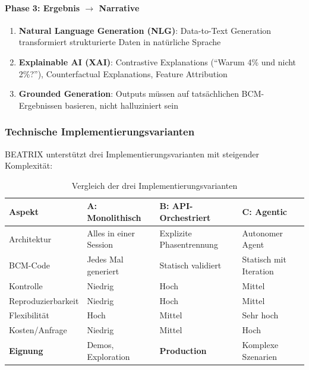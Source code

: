 \paragraph{Phase 3: Ergebnis $\rightarrow$ Narrative}

\begin{enumerate}
    \item \textbf{Natural Language Generation (NLG)}: Data-to-Text Generation transformiert strukturierte Daten in natürliche Sprache

    \item \textbf{Explainable AI (XAI)}: Contrastive Explanations (``Warum 4\% und nicht 2\%?''), Counterfactual Explanations, Feature Attribution

    \item \textbf{Grounded Generation}: Outputs müssen auf tatsächlichen BCM-Ergebnissen basieren, nicht halluziniert sein
\end{enumerate}

\subsubsection{Technische Implementierungsvarianten}

BEATRIX unterstützt drei Implementierungsvarianten mit steigender Komplexität:

\begin{table}[h]
\centering
\caption{Vergleich der drei Implementierungsvarianten}
\small
\begin{tabular}{@{}llll@{}}
\toprule
\textbf{Aspekt} & \textbf{A: Monolithisch} & \textbf{B: API-Orchestriert} & \textbf{C: Agentic} \\
\midrule
Architektur & Alles in einer Session & Explizite Phasentrennung & Autonomer Agent \\
BCM-Code & Jedes Mal generiert & Statisch validiert & Statisch mit Iteration \\
Kontrolle & Niedrig & Hoch & Mittel \\
Reproduzierbarkeit & Niedrig & Hoch & Mittel \\
Flexibilität & Hoch & Mittel & Sehr hoch \\
Kosten/Anfrage & Niedrig & Mittel & Hoch \\
\midrule
\textbf{Eignung} & Demos, Exploration & \textbf{Production} & Komplexe Szenarien \\
\bottomrule
\end{tabular}
\end{table}

